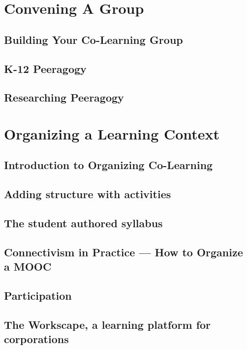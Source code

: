\documentclass[ebook, 12pt, twoside]{memoir}
\begin{document}
\part{Convening A Group} %
%
\chapter[\textbf{Convening}]{Building Your Co-Learning Group}

%
\chapter[\textbf{K-12 Peeragogy}]{K-12 Peeragogy}
%

%
\chapter[\textbf{Researching Peeragogy}]{Researching Peeragogy}
%

%
\part{Organizing a Learning Context} %
%
\chapter[\textbf{Organizing Co-Learning}]{Introduction to Organizing Co-Learning}

%
\chapter[\textbf{Adding structure}]{Adding structure with activities}
%

%
\chapter[\textbf{The student authored syllabus}]{ The student authored syllabus } 
%

%
\chapter[\textbf{How to Organize a MOOC}]{ Connectivism in Practice ---  How to Organize a MOOC}
%

%
\chapter[\textbf{Participation}]{ Participation }
%

%
\chapter[\textbf{The Workscape}]{ The Workscape, a learning platform for corporations }
%

%
\end{document}
